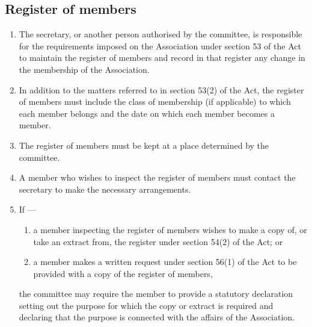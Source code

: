 \documentclass[../constitution.tex]{subfiles}
\begin{document}
\hypertarget{register-of-members}{%
  \subsection{Register of members}\label{register-of-members}}

\begin{enumerate}

  \item The secretary, or another person authorised by the committee, is responsible for the requirements imposed on the Association under section 53 of the Act to maintain the register of members and record in that register any change in the membership of the Association.
  \item In addition to the matters referred to in section 53(2) of the Act, the register of members must include the class of membership (if applicable) to which each member belongs and the date on which each member becomes a member.
  \item The register of members must be kept at a place determined by the committee.
  \item A member who wishes to inspect the register of members must contact the secretary to make the necessary arrangements.
  \item If ---

        \begin{enumerate}
          \item a member inspecting the register of members wishes to make a copy of, or take an extract from, the register under section 54(2) of the Act; or
          \item a member makes a written request under section 56(1) of the Act to be provided with a copy of the register of members,

        \end{enumerate}
        the committee may require the member to provide a statutory declaration setting out the purpose for which the copy or extract is required and declaring that the purpose is connected with the affairs of the Association.
\end{enumerate}
\end{document}
